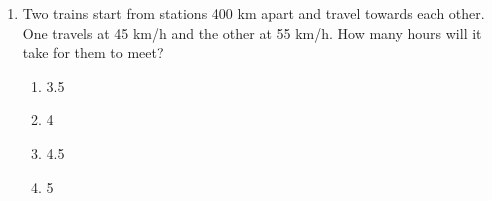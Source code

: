 \documentclass[12pt]{article}
\begin{document}
\begin{enumerate}
    \item Two trains start from stations 400 km apart and travel towards each other. One travels at 45 km/h and the other at 55 km/h. How many hours will it take for them to meet?
    \begin{enumerate}
        \item 3.5
        \item 4
        \item 4.5
        \item 5
    \end{enumerate}

\end{enumerate}
\end{document}
